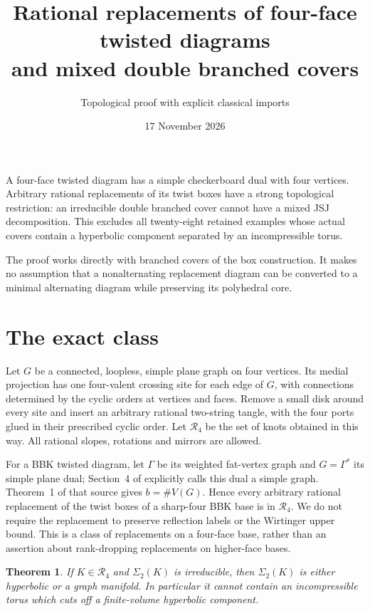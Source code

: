 \documentclass[11pt]{article}
\title{Rational replacements of four-face twisted diagrams\\
and mixed double branched covers}
\author{Topological proof with explicit classical imports}
\date{17 November 2026}
\newtheorem{theorem}{Theorem}
\newcommand{\Sig}{\Sigma_2}
\begin{document}
\maketitle

A four-face twisted diagram has a simple checkerboard dual with four
vertices. Arbitrary rational replacements of its twist boxes have a
strong topological restriction: an irreducible double branched cover
cannot have a mixed JSJ decomposition. This excludes all twenty-eight
retained examples whose actual covers contain a hyperbolic component
separated by an incompressible torus.

The proof works directly with branched covers of the box construction.
It makes no assumption that a nonalternating replacement diagram can be
converted to a minimal alternating diagram while preserving its
polyhedral core.

\section{The exact class}

Let $G$ be a connected, loopless, simple plane graph on four vertices.
Its medial projection has one four-valent crossing site for each edge
of $G$, with connections determined by the cyclic orders at vertices and
faces. Remove a small disk around every site and insert an arbitrary
rational two-string tangle, with the four ports glued in their prescribed
cyclic order. Let $\mathcal R_4$ be the set of knots obtained in this way.
All rational slopes, rotations and mirrors are allowed.

For a BBK twisted diagram, let $\Gamma$ be its weighted fat-vertex
graph and $G=\Gamma^*$ its simple plane dual; Section~4 of \cite{bbk}
explicitly calls this dual a simple graph. Theorem~1 of that source
gives $b=\#V(G)$. Hence every arbitrary rational replacement of the
twist boxes of a sharp-four BBK base is in $\mathcal R_4$.
We do not require the replacement to preserve reflection labels or the
Wirtinger upper bound. This is a class of replacements on a four-face
base, rather than an assertion about rank-dropping replacements on
higher-face bases.

\begin{theorem}\label{thm:class}
If $K\in\mathcal R_4$ and $\Sig(K)$ is irreducible, then $\Sig(K)$
is either hyperbolic or a graph manifold.
In particular it cannot contain an incompressible torus which cuts
off a finite-volume hyperbolic component.
\end{theorem}
\end{document}
